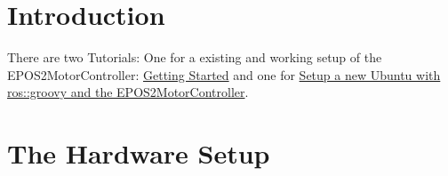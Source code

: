 \hypertarget{index_intro_sec}{}\section{Introduction}\label{index_intro_sec}
There are two Tutorials\-: One for a existing and working setup of the E\-P\-O\-S2\-Motor\-Controller\-: \hyperlink{start}{Getting Started} and one for \hyperlink{setup}{Setup a new Ubuntu with ros\-::groovy and the E\-P\-O\-S2\-Motor\-Controller}.\hypertarget{index_hw_setup}{}\section{The Hardware Setup}\label{index_hw_setup}

